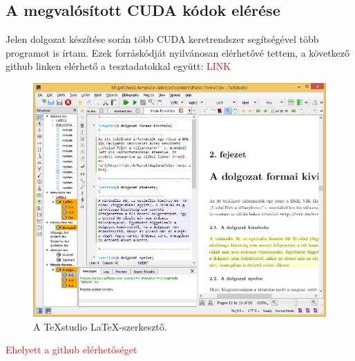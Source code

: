 \appendix
\chapter*{\fuggelek}
\setcounter{chapter}{\appendixnumber}
\section{A megvalósított CUDA kódok elérése}
Jelen dolgozat készítése során több CUDA keretrendszer segítségével több programot is írtam. Ezek forráskódját nyilvánosan elérhetővé tettem, a következő github linken elérhető a tesztadatokkal együtt: \textcolor{red}{LINK} 
\begin{figure}[!ht]
\centering
\includegraphics[width=150mm, keepaspectratio]{figures/TeXstudio.png}
\caption{A TeXstudio \LaTeX-szerkesztő.} 
\end{figure}

\textcolor{red}{Ehelyett a github elérhetőséget}

